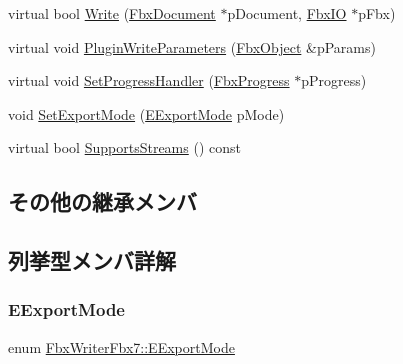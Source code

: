 \begin{DoxyCompactItemize}
virtual bool \hyperlink{class_fbx_writer_fbx7_a4e20df937a566f3b5eb68427808354f9}{Write} (\hyperlink{class_fbx_document}{Fbx\+Document} $\ast$p\+Document, \hyperlink{class_fbx_i_o}{Fbx\+IO} $\ast$p\+Fbx)
\item 
virtual void \hyperlink{class_fbx_writer_fbx7_a36f757ea224bdb66cf732cb9a5a534f2}{Plugin\+Write\+Parameters} (\hyperlink{class_fbx_object}{Fbx\+Object} \&p\+Params)
\item 
virtual void \hyperlink{class_fbx_writer_fbx7_a80285d709aabb9d36f3f10d95cebf356}{Set\+Progress\+Handler} (\hyperlink{class_fbx_progress}{Fbx\+Progress} $\ast$p\+Progress)
\item 
void \hyperlink{class_fbx_writer_fbx7_aaa8b395c07a3ded65291060522d06848}{Set\+Export\+Mode} (\hyperlink{class_fbx_writer_fbx7_a07b7bcbb11c9befcbd0eacd265458005}{E\+Export\+Mode} p\+Mode)
\item 
virtual bool \hyperlink{class_fbx_writer_fbx7_a1db3d07967773f3b1af23d15757c281a}{Supports\+Streams} () const
\end{DoxyCompactItemize}
\subsection*{その他の継承メンバ}


\subsection{列挙型メンバ詳解}
\mbox{\label{class_fbx_writer_fbx7_a07b7bcbb11c9befcbd0eacd265458005}} 
\subsubsection{\texorpdfstring{E\+Export\+Mode}{EExportMode}}
{\footnotesize\ttfamily enum \hyperlink{class_fbx_writer_fbx7_a07b7bcbb11c9befcbd0eacd265458005}{Fbx\+Writer\+Fbx7\+::\+E\+Export\+Mode}}

